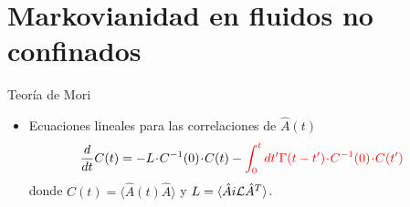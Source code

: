 \documentclass{beamer}
\newcommand{\esc}{\!\cdot\!}
\begin{document}
\section{Markovianidad en fluidos no confinados}
\begin{frame}{Teoría de Mori}
  \begin{itemize}
    \item<1-> Ecuaciones lineales para las correlaciones de $\hat{A}(t)$
\begin{align}
  \frac{d}{dt}C(t)&=-L\esc C^{-1}(0)\esc C(t)
  -{\color{red}\int_0^tdt' \Gamma(t-t')\esc C^{-1}(0)\esc  C(t')}
\nonumber
\end{align}
      donde $C(t)=\langle\hat{A}(t)\hat{A}\rangle$ y $L=\langle \hat{A}i{\cal L}\hat{A}^T\rangle$.


\end{itemize}
\end{frame}
\end{document}
